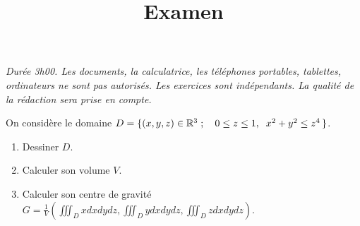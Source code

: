 \documentclass[a4paper]{tp_um}
\title{\large \sffamily\bfseries Examen}
\begin{document}
\maketitle
\textit{Durée 3h00. Les documents, la calculatrice, les téléphones portables, tablettes, ordinateurs ne sont pas autorisés. Les exercices sont indépendants. La qualité de la rédaction sera prise en compte.} 

\bigskip
\bigskip


\exo
\noindent On consid\`ere le domaine $D=\{(x,y,z)\in \mathbb{R}^3\; ;\quad  0\leq z\leq 1, \;\; x^2+y^2\leq z^4\,\}$.
\begin{enumerate}
\item Dessiner $D$.


\item Calculer son volume $V$.



\item Calculer son centre de gravit\'e  $G =  \frac{1}{V} \left( \iiint_D x dxdydz, \iiint_D y dxdydz , \iiint_D z dxdydz \right)$.


\end{enumerate}
\end{document}
